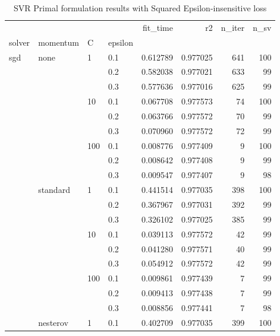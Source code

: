 \begin{table}[H]
\centering
\caption{SVR Primal formulation results with Squared Epsilon-insensitive loss}
\label{primal_svr_squared_eps_cv_results}
\begin{tabular}{llllrrrr}
\toprule
          &   &     &     &  fit\_time &        r2 &  n\_iter &  n\_sv \\
solver & momentum & C & epsilon &           &           &         &       \\
\midrule
sgd & none & 1   & 0.1 &  0.612789 &  0.977025 &     641 &   100 \\
          &   &     & 0.2 &  0.582038 &  0.977021 &     633 &    99 \\
          &   &     & 0.3 &  0.577636 &  0.977016 &     625 &    99 \\
          &   & 10  & 0.1 &  0.067708 &  0.977573 &      74 &   100 \\
          &   &     & 0.2 &  0.063766 &  0.977572 &      70 &    99 \\
          &   &     & 0.3 &  0.070960 &  0.977572 &      72 &    99 \\
          &   & 100 & 0.1 &  0.008776 &  0.977409 &       9 &   100 \\
          &   &     & 0.2 &  0.008642 &  0.977408 &       9 &    99 \\
          &   &     & 0.3 &  0.009547 &  0.977407 &       9 &    98 \\
          & standard & 1   & 0.1 &  0.441514 &  0.977035 &     398 &   100 \\
          &   &     & 0.2 &  0.367967 &  0.977031 &     392 &    99 \\
          &   &     & 0.3 &  0.326102 &  0.977025 &     385 &    99 \\
          &   & 10  & 0.1 &  0.039113 &  0.977572 &      42 &    99 \\
          &   &     & 0.2 &  0.041280 &  0.977571 &      40 &    99 \\
          &   &     & 0.3 &  0.054912 &  0.977572 &      42 &    99 \\
          &   & 100 & 0.1 &  0.009861 &  0.977439 &       7 &    99 \\
          &   &     & 0.2 &  0.009413 &  0.977438 &       7 &    99 \\
          &   &     & 0.3 &  0.008856 &  0.977441 &       7 &    98 \\
          & nesterov & 1   & 0.1 &  0.402709 &  0.977035 &     399 &   100 \\

\end{tabular}
\end{table}
